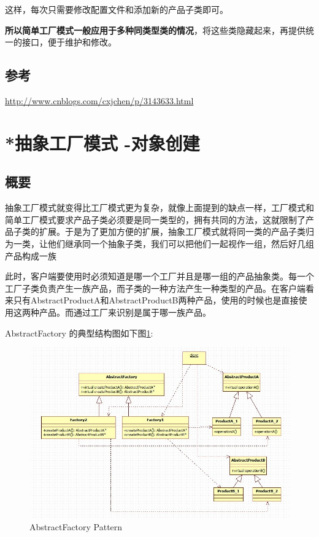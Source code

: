 \documentclass[UTF8,a4paper,12pt]{ctexbook}
\begin{document}
		这样，每次只需要修改配置文件和添加新的产品子类即可。
		
		\textbf{所以简单工厂模式一般应用于多种同类型类的情况}，将这些类隐藏起来，再提供统一的接口，便于维护和修改。	
	
	\subsection{参考}
		\url{http://www.cnblogs.com/cxjchen/p/3143633.html}
\newpage
\section{*抽象工厂模式 -对象创建}
	\subsection{概要}
		抽象工厂模式就变得比工厂模式更为复杂，就像上面提到的缺点一样，工厂模式和简单工厂模式要求产品子类必须要是同一类型的，拥有共同的方法，这就限制了产品子类的扩展。于是为了更加方便的扩展，抽象工厂模式就将同一类的产品子类归为一类，让他们继承同一个抽象子类，我们可以把他们一起视作一组，然后好几组产品构成一族
		
		此时，客户端要使用时必须知道是哪一个工厂并且是哪一组的产品抽象类。每一个工厂子类负责产生一族产品，而子类的一种方法产生一种类型的产品。在客户端看来只有AbstractProductA和AbstractProductB两种产品，使用的时候也是直接使用这两种产品。而通过工厂来识别是属于哪一族产品。
		
		AbstractFactory 的典型结构图如下图\ref{AbstractFactory}:
		\begin{figure}[h]
			\centering
			\includegraphics[width = 14cm]{AbstractFactory.jpg}
			\caption{AbstractFactory Pattern}
			\label{AbstractFactory}
		\end{figure}
		
\end{document}
